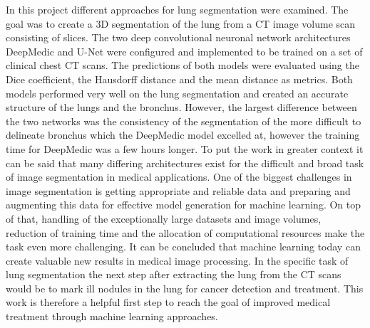 
In this project different approaches for lung segmentation were examined. The goal was to create a 3D segmentation of the lung from a CT image volume scan consisting of slices. The two deep convolutional neuronal network architectures DeepMedic and U-Net were configured and implemented to be trained on a set of clinical chest CT scans. The predictions of both models were evaluated using the Dice coefficient, the Hausdorff distance and the mean distance as metrics. Both models performed very well on the lung segmentation and created an accurate structure of the lungs and the bronchus. However, the largest difference between the two networks was the consistency of the segmentation of the more difficult to delineate bronchus which the DeepMedic model excelled at, however the training time for DeepMedic was a few hours longer.\newline
To put the work in greater context it can be said that many differing architectures exist for the difficult and broad task of image segmentation in medical applications. One of the biggest challenges in image segmentation is getting appropriate and reliable data and preparing and augmenting this data for effective model generation for machine learning. On top of that, handling of the exceptionally large datasets and image volumes, reduction of training time and the allocation of computational resources make the task even more challenging.\newline
It can be concluded that machine learning today can create valuable new results in medical image processing. In the specific task of lung segmentation the next step after extracting the lung from the CT scans would be to mark ill nodules in the lung for cancer detection and treatment. This work is therefore a helpful first step to reach the goal of improved medical treatment through machine learning approaches.